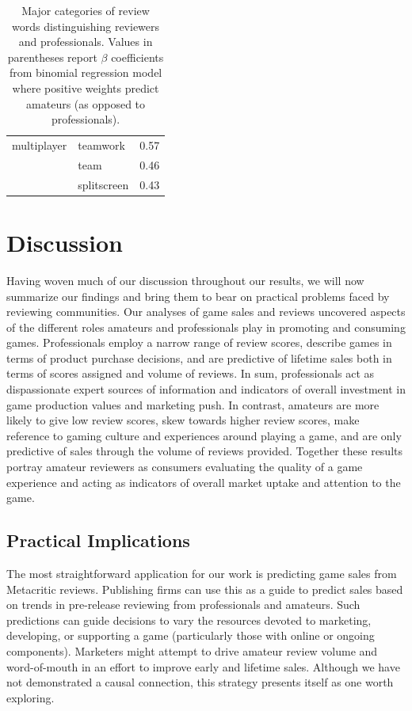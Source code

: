 \documentclass{sig-alternate}
\begin{document}
\begin{table}[tb!]
\begin{tabular}{llc}
\midrule 
multiplayer 
& teamwork & 0.57 \\ 
& team & 0.46 \\ 
& splitscreen & 0.43 \\

\end{tabular}
\caption{Major categories of review words distinguishing reviewers and professionals. Values in parentheses report $\beta$ coefficients from binomial regression model where positive weights predict amateurs (as opposed to professionals).}
\label{tab:user_classification_coef}
\end{table}

\pagebreak

\section{Discussion}
Having woven much of our discussion throughout our results, we will
now summarize our findings and bring them to bear on practical problems
faced by reviewing communities. Our analyses of game sales and reviews uncovered aspects of the different roles amateurs and professionals play in promoting and consuming games. Professionals employ a narrow range of review scores, describe games in terms of product purchase decisions, and are predictive of lifetime sales both in terms of scores assigned and volume of reviews. In sum, professionals act as dispassionate expert sources of information and indicators of overall investment in game production values and marketing push. In contrast, amateurs are more likely to give low review scores, skew towards higher review scores, make reference to gaming culture and experiences around playing a game, and are only predictive of sales through the volume of reviews provided. Together these results portray amateur reviewers as consumers evaluating the quality of a game experience and acting as indicators of overall market uptake and attention to the game.


\subsection{Practical Implications}
The most straightforward application for our work is predicting game sales from Metacritic reviews. Publishing firms can use this as a guide to predict sales based on trends in pre-release reviewing from professionals and amateurs. Such predictions can guide decisions to vary the resources devoted to marketing, developing, or supporting a game (particularly those with online or ongoing components). Marketers might attempt to drive amateur review volume and word-of-mouth in an effort to improve early and lifetime sales. Although we have not demonstrated a causal connection, this strategy presents itself as one worth exploring.
\end{document}

